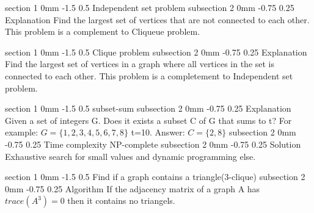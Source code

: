 \documentclass[a4paper,11pt]{article}
\makeatletter
\renewcommand{\section}{\@startsection
   {section}%
   {1}%
   {0mm}%
   {-1.5\baselineskip}%
   {0.5\baselineskip}%
   {\sffamily\bfseries\upshape\normalsize}}%
\renewcommand{\subsection}{\@startsection
   {subsection}%
   {2}%
   {0mm}%
   {-0.75\baselineskip}%
   {0.25\baselineskip}%
   {\rmfamily\normalfont\slshape\normalsize}}%
\makeatother
\begin{document}
\section{Independent set problem}
\subsection{Explanation}
Find the largest set of vertices that are not connected to each other. This problem is a complement to Cliqueue problem.

\section{Clique problem}
\subsection{Explanation}
Find the largest set of vertices in a graph where all vertices in the set is connected to each other. This problem is a completement to Independent set problem.


\section{subset-sum}
\subsection{Explanation}
Given a set of integers G. Does it exists a subset C of G that sums to t?
For example:
$G=\{1,2,3,4,5,6,7,8\}$ t=10. Answer: $C=\{2,8\}$
\subsection{Time complexity}
NP-complete
\subsection{Solution}
Exhaustive search for small values and dynamic programming else.

\section{Find if a graph contains a triangle(3-clique)}
\subsection{Algorithm}
If the adjacency matrix of a graph A has $trace(A^3)=0$ then it contains no triangels.
\end{document}
